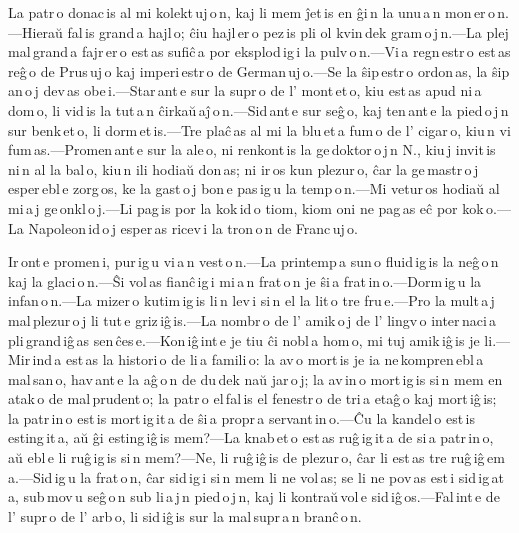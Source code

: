 \documentclass[ngerman,12pt,twoside]{book}
\begin{document}

La patr\,o donac\,is al mi kolekt\,uj\,o\,n, kaj li mem ĵet\,is en ĝi\,n la unu\,a\,n mon\,er\,o\,n.---Hieraŭ fal\,is grand\,a hajl\,o; ĉiu hajl\,er\,o pez\,is pli ol kvin\,dek gram\,o\,j\,n.---La plej mal\,grand\,a fajr\,er\,o est\,as sufiĉ\,a por eksplod\,ig\,i la pulv\,o\,n.---Vi\,a regn\,estr\,o est\,as reĝ\,o de Prus\,uj\,o kaj imperi\,estr\,o de German\,uj\,o.---Se la ŝip\,estr\,o ordon\,as, la ŝip\,an\,o\,j dev\,as obe\,i.---Star\,ant\,e sur la supr\,o de l' mont\,et\,o, kiu est\,as apud ni\,a dom\,o, li vid\,is la tut\,a\,n ĉirkaŭ\,aĵ\,o\,n.---Sid\,ant\,e sur seĝ\,o, kaj ten\,ant\,e la pied\,o\,j\,n sur benk\,et\,o, li dorm\,et\,is.---Tre plaĉ\,as al mi la blu\,et\,a fum\,o de l' cigar\,o, kiu\,n vi fum\,as.---Promen\,ant\,e sur la ale\,o, ni renkont\,is la ge\,doktor\,o\,j\,n N., kiu\,j invit\,is ni\,n al la bal\,o, kiu\,n ili hodiaŭ don\,as; ni ir\,os kun plezur\,o, ĉar la ge\,mastr\,o\,j esper\,ebl\,e zorg\,os, ke la gast\,o\,j bon\,e pas\,ig\,u la temp\,o\,n.---Mi vetur\,os hodiaŭ al mi\,a\,j ge\,onkl\,o\,j.---Li pag\,is por la kok\,id\,o tiom, kiom oni ne pag\,as eĉ por kok\,o.---La Napoleon\,id\,o\,j esper\,as ricev\,i la tron\,o\,n de Franc\,uj\,o. 



Ir\,ont\,e promen\,i, pur\,ig\,u vi\,a\,n vest\,o\,n.---La printemp\,a sun\,o fluid\,ig\,is la neĝ\,o\,n kaj la glaci\,o\,n.---Ŝi vol\,as fianĉ\,ig\,i mi\,a\,n frat\,o\,n je ŝi\,a frat\,in\,o.---Dorm\,ig\,u la infan\,o\,n.---La mizer\,o kutim\,ig\,is li\,n lev\,i si\,n el la lit\,o tre fru\,e.---Pro la mult\,a\,j mal\,plezur\,o\,j li tut\,e griz\,iĝ\,is.---La nombr\,o de l' amik\,o\,j de l' lingv\,o inter\,naci\,a pli\,grand\,iĝ\,as sen\,ĉes\,e.---Kon\,iĝ\,int\,e je tiu ĉi nobl\,a hom\,o, mi tuj amik\,iĝ\,is je li.---Mir\,ind\,a est\,as la histori\,o de li\,a famili\,o: la av\,o mort\,is je ia ne\,kompren\,ebl\,a mal\,san\,o, hav\,ant\,e la aĝ\,o\,n de du\,dek naŭ jar\,o\,j; la av\,in\,o mort\,ig\,is si\,n mem en atak\,o de mal\,prudent\,o; la patr\,o el\,fal\,is el fenestr\,o de tri\,a etaĝ\,o kaj mort\,iĝ\,is; la patr\,in\,o est\,is mort\,ig\,it\,a de ŝi\,a propr\,a servant\,in\,o.---Ĉu la kandel\,o est\,is esting\,it\,a, aŭ ĝi esting\,iĝ\,is mem?---La knab\,et\,o est\,as ruĝ\,ig\,it\,a de si\,a patr\,in\,o, aŭ ebl\,e li ruĝ\,ig\,is si\,n mem?---Ne, li ruĝ\,iĝ\,is de plezur\,o, ĉar li est\,as tre ruĝ\,iĝ\,em\,a.---Sid\,ig\,u la frat\,o\,n, ĉar sid\,ig\,i si\,n mem li ne vol\,as; se li ne pov\,as est\,i sid\,ig\,at\,a, sub\,mov\,u seĝ\,o\,n sub li\,a\,j\,n pied\,o\,j\,n, kaj li kontraŭ\,vol\,e sid\,iĝ\,os.---Fal\,int\,e de l' supr\,o de l' arb\,o, li sid\,iĝ\,is sur la mal\,supr\,a\,n branĉ\,o\,n. 
\end{document}
